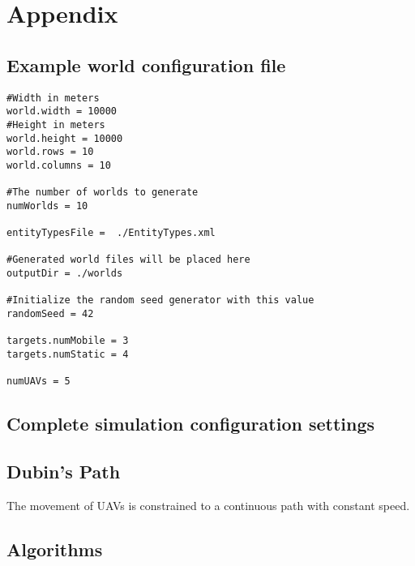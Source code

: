 \chapter{Appendix}


\section{Example world configuration file}
\label{sec:exampleWorldCfg}
\begin{verbatim}
#Width in meters
world.width = 10000
#Height in meters
world.height = 10000
world.rows = 10
world.columns = 10

#The number of worlds to generate
numWorlds = 10

entityTypesFile =  ./EntityTypes.xml

#Generated world files will be placed here
outputDir = ./worlds

#Initialize the random seed generator with this value
randomSeed = 42

targets.numMobile = 3
targets.numStatic = 4

numUAVs = 5
\end{verbatim}


\section{Complete simulation configuration settings}

\section{Dubin's Path} \label{sec:dubin}
The movement of UAVs is constrained to a continuous path with constant speed.

\section{Algorithms}
\label{sec:algorithms}

